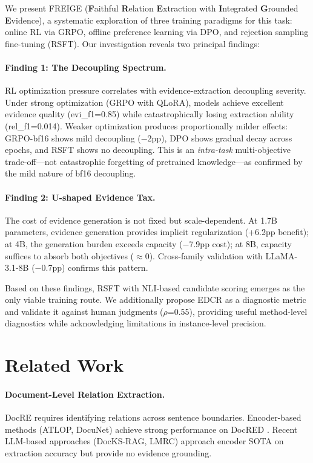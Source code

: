 \documentclass[11pt,a4paper]{article}
\begin{document}
We present FREIGE (\textbf{F}aithful \textbf{R}elation \textbf{E}xtraction with \textbf{I}ntegrated \textbf{G}rounded \textbf{E}vidence), a systematic exploration of three training paradigms for this task: online RL via GRPO, offline preference learning via DPO, and rejection sampling fine-tuning (RSFT). Our investigation reveals two principal findings:

\paragraph{Finding 1: The Decoupling Spectrum.} RL optimization pressure correlates with evidence-extraction decoupling severity. Under strong optimization (GRPO with QLoRA), models achieve excellent evidence quality (evi\_f1=0.85) while catastrophically losing extraction ability (rel\_f1=0.014). Weaker optimization produces proportionally milder effects: GRPO-bf16 shows mild decoupling ($-$2pp), DPO shows gradual decay across epochs, and RSFT shows no decoupling. This is an \emph{intra-task} multi-objective trade-off---not catastrophic forgetting of pretrained knowledge---as confirmed by the mild nature of bf16 decoupling.

\paragraph{Finding 2: U-shaped Evidence Tax.} The cost of evidence generation is not fixed but scale-dependent. At 1.7B parameters, evidence generation provides implicit regularization (+6.2pp benefit); at 4B, the generation burden exceeds capacity ($-$7.9pp cost); at 8B, capacity suffices to absorb both objectives ($\approx$0). Cross-family validation with LLaMA-3.1-8B ($-$0.7pp) confirms this pattern.

Based on these findings, RSFT with NLI-based candidate scoring emerges as the only viable training route. We additionally propose EDCR as a diagnostic metric and validate it against human judgments ($\rho$=0.55), providing useful method-level diagnostics while acknowledging limitations in instance-level precision.

\section{Related Work}

\paragraph{Document-Level Relation Extraction.} DocRE requires identifying relations across sentence boundaries. Encoder-based methods (ATLOP, DocuNet) achieve strong performance on DocRED \cite{yao2019docred}. Recent LLM-based approaches (DocKS-RAG, LMRC) approach encoder SOTA on extraction accuracy but provide no evidence grounding.
\end{document}
